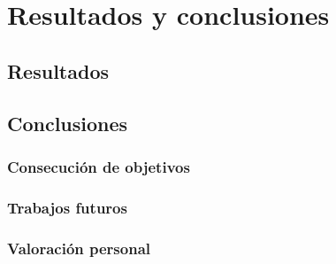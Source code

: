 \chapter{Resultados y conclusiones}
\label{cha:results}


\section{Resultados}

\section{Conclusiones}

\subsection{Consecución de objetivos}
\subsection{Trabajos futuros} \label{trabajosfuturos}
\subsection{Valoración personal}
